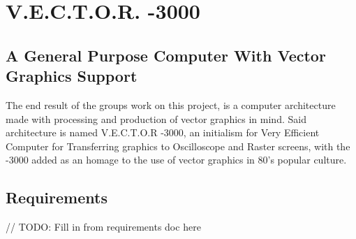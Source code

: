 \chapter{V.E.C.T.O.R. -3000}

\section{A General Purpose Computer With Vector Graphics Support}

The end result of the groups work on this project, is a computer architecture made with processing and production of vector graphics in mind.
Said architecture is named V.E.C.T.O.R -3000, an initialism for Very Efficient Computer for Transferring graphics to Oscilloscope and Raster screens, with the -3000 added as an homage to the use of vector graphics in 80's popular culture.

\section{Requirements}

// TODO: Fill in from requirements doc here
